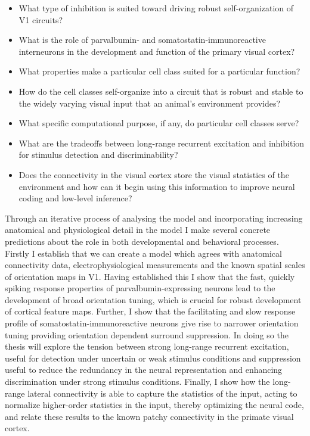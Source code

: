 \begin{itemize}
\item What type of inhibition is suited toward driving robust
  self-organization of V1 circuits?
\item What is the role of parvalbumin- and somatostatin-immunoreactive
  interneurons in the development and function of the primary visual
  cortex?
\item What properties make a particular cell class suited for a
  particular function?
\item How do the cell classes self-organize into a circuit that is
  robust and stable to the widely varying visual input that an
  animal's environment provides?
\item What specific computational purpose, if any, do particular cell
  classes serve?
\item What are the tradeoffs between long-range recurrent excitation
  and inhibition for stimulus detection and discriminability?
\item Does the connectivity in the visual cortex store the visual
  statistics of the environment and how can it begin using this
  information to improve neural coding and low-level inference?
\end{itemize}

Through an iterative process of analysing the model and incorporating
increasing anatomical and physiological detail in the model I make
several concrete predictions about the role in both developmental and
behavioral processes. Firstly I establish that we can create a model
which agrees with anatomical connectivity data, electrophysiological
measurements and the known spatial scales of orientation maps in V1.
Having established this I show that the fast, quickly spiking response
properties of parvalbumin-expressing neurons lead to the development
of broad orientation tuning, which is crucial for robust development
of cortical feature maps. Further, I show that the facilitating and
slow response profile of somatostatin-immunoreactive neurons give rise
to narrower orientation tuning providing orientation dependent
surround suppression. In doing so the thesis will explore the tension
between strong long-range recurrent excitation, useful for detection
under uncertain or weak stimulus conditions and suppression useful to
reduce the redundancy in the neural representation and enhancing
discrimination under strong stimulus conditions. Finally, I show how
the long-range lateral connectivity is able to capture the statistics
of the input, acting to normalize higher-order statistics in the
input, thereby optimizing the neural code, and relate these results to
the known patchy connectivity in the primate visual cortex.

